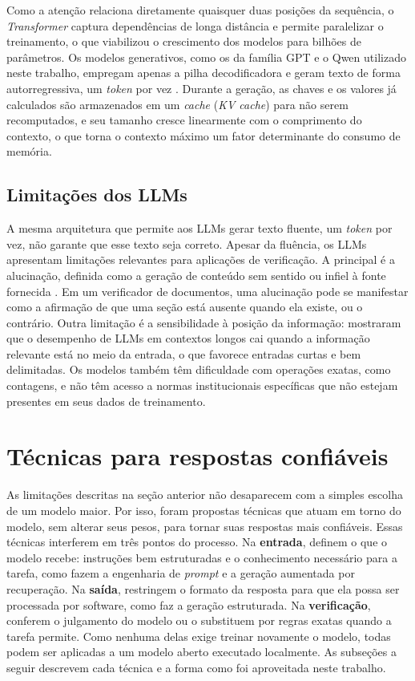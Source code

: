 Como a atenção relaciona diretamente quaisquer duas posições da sequência, o \textit{Transformer} captura dependências de longa distância e permite paralelizar o treinamento, o que viabilizou o crescimento dos modelos para bilhões de parâmetros. Os modelos generativos, como os da família GPT e o Qwen utilizado neste trabalho, empregam apenas a pilha decodificadora e geram texto de forma autorregressiva, um \textit{token} por vez \cite{Brown2020, Qwen2024}. Durante a geração, as chaves e os valores já calculados são armazenados em um \textit{cache} (\textit{KV cache}) para não serem recomputados, e seu tamanho cresce linearmente com o comprimento do contexto, o que torna o contexto máximo um fator determinante do consumo de memória.

\subsection{Limitações dos LLMs}

A mesma arquitetura que permite aos LLMs gerar texto fluente, um \textit{token} por vez, não garante que esse texto seja correto. Apesar da fluência, os LLMs apresentam limitações relevantes para aplicações de verificação. A principal é a alucinação, definida como a geração de conteúdo sem sentido ou infiel à fonte fornecida \cite{Ji2023}. Em um verificador de documentos, uma alucinação pode se manifestar como a afirmação de que uma seção está ausente quando ela existe, ou o contrário. Outra limitação é a sensibilidade à posição da informação:  mostraram que o desempenho de LLMs em contextos longos cai quando a informação relevante está no meio da entrada, o que favorece entradas curtas e bem delimitadas. Os modelos também têm dificuldade com operações exatas, como contagens, e não têm acesso a normas institucionais específicas que não estejam presentes em seus dados de treinamento.

\section{Técnicas para respostas confiáveis}
\label{sec:tecnicas}

As limitações descritas na seção anterior não desaparecem com a simples escolha de um modelo maior. Por isso, foram propostas técnicas que atuam em torno do modelo, sem alterar seus pesos, para tornar suas respostas mais confiáveis. Essas técnicas interferem em três pontos do processo. Na \textbf{entrada}, definem o que o modelo recebe: instruções bem estruturadas e o conhecimento necessário para a tarefa, como fazem a engenharia de \textit{prompt} e a geração aumentada por recuperação. Na \textbf{saída}, restringem o formato da resposta para que ela possa ser processada por software, como faz a geração estruturada. Na \textbf{verificação}, conferem o julgamento do modelo ou o substituem por regras exatas quando a tarefa permite. Como nenhuma delas exige treinar novamente o modelo, todas podem ser aplicadas a um modelo aberto executado localmente. As subseções a seguir descrevem cada técnica e a forma como foi aproveitada neste trabalho.

